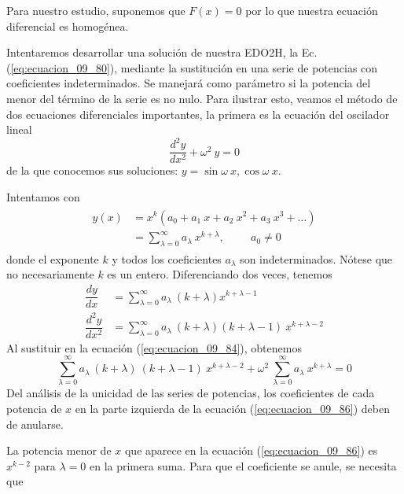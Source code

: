\par
Para nuestro estudio, suponemos que $F(x) = 0$ por lo que nuestra ecuación diferencial es homogénea.
\par
Intentaremos desarrollar una solución de nuestra EDO2H, la Ec. (\ref{eq:ecuacion_09_80}), mediante la sustitución en una serie de potencias con coeficientes indeterminados. Se manejará como parámetro si la potencia del menor del término de la serie es no nulo. Para ilustrar esto, veamos el método de dos ecuaciones diferenciales importantes, la primera es la ecuación del oscilador lineal
\begin{equation}
\dfrac{d^{2} y}{d x^{2}} + \omega^{2} \: y = 0
\label{eq:ecuacion_09_84}
\end{equation}
de la que conocemos sus soluciones: $y= \sin \omega \: x, \cos \omega \: x$.
\par
Intentamos con
\begin{align}
\begin{aligned}
y(x) &= x^{k} (a_{0} + a_{1} \: x + a_{2} \: x^{2} + a_{3} \: x^{3} + \ldots ) \\
&= \sum_{\lambda = 0}^{\infty} a_{\lambda} \: x^{k + \lambda}, \hspace{1cm} a_{0} \neq 0
\end{aligned}
\label{eq:ecuacion_09_85}
\end{align}
donde el exponente $k$ y todos los coeficientes $a_{\lambda}$ son indeterminados. Nótese que no necesariamente $k$ es un entero. Diferenciando dos veces, tenemos
\begin{align*}
\dfrac{dy}{dx} &= \sum_{\lambda=0}^{\infty} a_{\lambda} \: (k + \lambda) x^{k + \lambda - 1} \nonumber \\
\dfrac{d^{2} y}{d x^{2}} &= \sum_{\lambda=0}^{\infty} a_{\lambda} \: (k + \lambda) (k + \lambda - 1) \: x^{k + \lambda - 2} \nonumber
\end{align*}
Al sustituir en la ecuación (\ref{eq:ecuacion_09_84}), obtenemos
\begin{equation}
\sum_{\lambda=0}^{\infty} a_{\lambda} \: (k + \lambda) \: (k + \lambda - 1) \: x^{k + \lambda - 2} + \omega^{2} \: \sum_{\lambda = 0}^{\infty} a_{\lambda} \: x^{k + \lambda} = 0
\label{eq:ecuacion_09_86}
\end{equation}
Del análisis de la unicidad de las series de potencias, los coeficientes de cada potencia de $x$ en la parte izquierda de la ecuación (\ref{eq:ecuacion_09_86}) deben de anularse.
\par
La potencia menor de $x$ que aparece en la ecuación (\ref{eq:ecuacion_09_86}) es $x^{k - 2}$ para $\lambda = 0$ en la primera suma. Para que el coeficiente se anule, se necesita que
